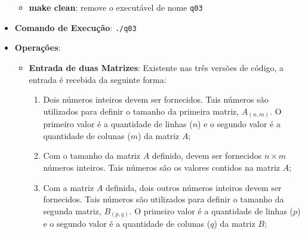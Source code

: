 \begin{itemize}
{\begin{itemize}
{\begin{align}
\begin{bmatrix}
				1 & 2 & 3 & 4 & 5 & 6 & 7 & 8
			\end{bmatrix}
			& \notag \\
			R = \ & A \times B & \notag \\
			= \ &
			\begin{bmatrix}
				78 & 57 & 75 & 60 & 72 & 63 & 69 & 66 \\
				198 & 132 & 170 & 120 & 142 & 108 & 114 & 96 \\
				78 & 57 & 75 & 60 & 72 & 63 & 69 & 66 \\
				198 & 132 & 170 & 120 & 142 & 108 & 114 & 96 \\
				198 & 132 & 170 & 120 & 142 & 108 & 114 & 96 \\
				78 & 57 & 75 & 60 & 72 & 63 & 69 & 66 \\
				198 & 132 & 170 & 120 & 142 & 108 & 114 & 96 \\
				78 & 57 & 75 & 60 & 72 & 63 & 69 & 66 \\
				104 & 46 & 105 & 65 & 106 & 84 & 107 & 103 \\
				144 & 111 & 130 & 105 & 116 & 99 & 102 & 93
			\end{bmatrix}
			& \label{eq:q03_tc3}
		\end{align}
		}
		\item{\textbf{make clean}: remove o executável de nome \texttt{q03}}
	\end{itemize}}
	\item{\textbf{Comando de Execução}: \texttt{./q03}}
	\item{\textbf{Operações}:
		\begin{itemize}
			\item{\textbf{Entrada de duas Matrizes}: Existente nas três versões de código, a entrada é recebida da seguinte forma:
			\begin{enumerate}
				\item{Dois números inteiros devem ser fornecidos. Tais números são utilizados para definir o tamanho da primeira matriz, $A_{(n,m)}$. O primeiro valor é a quantidade de linhas ($n$) e o segundo valor é a quantidade de colunas ($m$) da matriz $A$;}
				\item{Com o tamanho da matriz $A$ definido, devem ser fornecidos $n \times m$ números inteiros. Tais números são os valores contidos na matriz $A$;}
				\item{Com a matriz $A$ definida, dois outros números inteiros devem ser fornecidos. Tais números são utilizados para definir o tamanho da segunda matriz, $B_{(p,q)}$. O primeiro valor é a quantidade de linhas ($p$) e o segundo valor é a quantidade de colunas ($q$) da matriz $B$;}

\end{enumerate}}
\end{itemize}}
\end{itemize}
